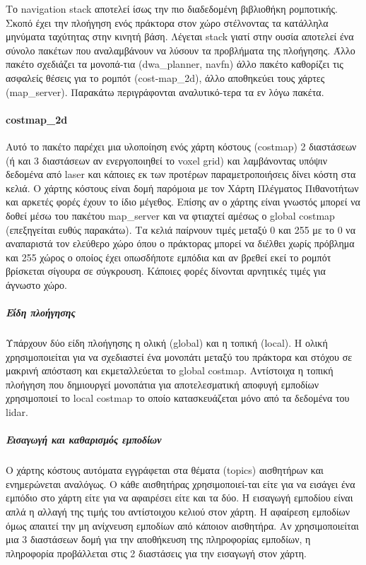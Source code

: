 Το navigation stack αποτελεί ίσως την πιο διαδεδομένη βιβλιοθήκη ρομποτικής. Σκοπό έχει την πλοήγηση ενός πράκτορα στον χώρο στέλνοντας τα κατάλληλα μηνύματα ταχύτητας στην κινητή βάση. Λέγεται stack γιατί στην ουσία αποτελεί ένα σύνολο πακέτων που αναλαμβάνουν να λύσουν τα προβλήματα της πλοήγησης. Άλλο πακέτο σχεδιάζει τα μονοπά-τια (dwa\_planner, navfn) άλλο πακέτο καθορίζει τις ασφαλείς θέσεις για το ρομπότ (cost-map\_2d), άλλο αποθηκεύει τους χάρτες (map\_server).
Παρακάτω περιγράφονται αναλυτικό-τερα τα εν λόγω πακέτα. 

\paragraph{costmap\_2d}

Αυτό το πακέτο παρέχει μια υλοποίηση ενός χάρτη κόστους (costmap) 2 διαστάσεων (ή και 3 διαστάσεων αν ενεργοποιηθεί το voxel grid) και λαμβάνοντας υπόψιν δεδομένα από laser και κάποιες εκ των προτέρων παραμετροποιήσεις δίνει κόστη στα κελιά. Ο χάρτης κόστους είναι δομή παρόμοια με τον Χάρτη Πλέγματος Πιθανοτήτων και αρκετές φορές έχουν το ίδιο μέγεθος. Επίσης αν ο χάρτης είναι γνωστός μπορεί να δοθεί μέσω του πακέτου map\_server και να φτιαχτεί αμέσως ο global costmap (επεξηγείται ευθύς παρακάτω). Τα κελιά παίρνουν τιμές μεταξύ 0 και 255 με το 0 να αναπαριστά τον ελεύθερο χώρο όπου ο πράκτορας μπορεί να διέλθει χωρίς πρόβλημα και 255 χώρος ο οποίος έχει οπωσδήποτε	εμπόδια και αν βρεθεί εκεί το ρομπότ βρίσκεται σίγουρα σε σύγκρουση. Κάποιες φορές δίνονται αρνητικές τιμές για άγνωστο χώρο.

\subparagraph{Είδη πλοήγησης} Υπάρχουν δύο είδη πλοήγησης η ολική (global) και η τοπική (local). Η ολική χρησιμοποιείται για να σχεδιαστεί ένα μονοπάτι μεταξύ του πράκτορα και στόχου σε μακρινή απόσταση και εκμεταλλεύεται το global costmap.
Αντίστοιχα η τοπική πλοήγηση που δημιουργεί μονοπάτια για αποτελεσματική αποφυγή εμποδίων χρησιμοποιεί το local costmap το οποίο κατασκευάζεται μόνο από τα δεδομένα του lidar. 

\subparagraph{Εισαγωγή και καθαρισμός εμποδίων} Ο χάρτης κόστους αυτόματα εγγράφεται στα θέματα (topics) αισθητήρων και ενημερώνεται αναλόγως. Ο κάθε αισθητήρας χρησιμοποιεί-ται είτε για να εισάγει ένα εμπόδιο στο χάρτη είτε για να αφαιρέσει είτε και τα δύο. Η εισαγωγή εμποδίου είναι απλά η αλλαγή της τιμής του αντίστοιχου κελιού στον χάρτη. H αφαίρεση εμποδίων όμως απαιτεί την μη ανίχνευση εμποδίων από κάποιον αισθητήρα. Αν χρησιμοποιείται μια 3 διαστάσεων δομή για την αποθήκευση της πληροφορίας εμποδίων, η πληροφορία προβάλλεται στις 2 διαστάσεις για την εισαγωγή στον χάρτη.

